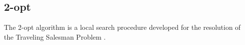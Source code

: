 \subsection{2-opt}
\label{sec:two_opt}

The 2-opt algorithm is a local search procedure developed for the resolution of the Traveling Salesman Problem \cite{two_opt_croes}. 